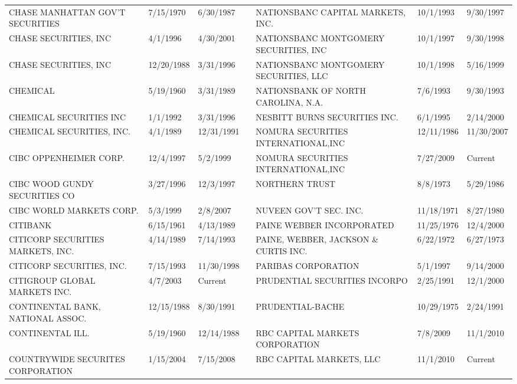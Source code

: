 \begin{tabular}{lllllll}
CHASE MANHATTAN GOV'T SECURITIES     & 7/15/1970 & 6/30/1987 &  & NATIONSBANC CAPITAL MARKETS, INC.   & 10/1/1993 & 9/30/1997 \\
CHASE SECURITIES, INC               & 4/1/1996 & 4/30/2001 &  & NATIONSBANC MONTGOMERY SECURITIES, INC & 10/1/1997 & 9/30/1998 \\
CHASE SECURITIES, INC                & 12/20/1988 & 3/31/1996 &  & NATIONSBANC MONTGOMERY SECURITIES, LLC & 10/1/1998 & 5/16/1999 \\
CHEMICAL                            & 5/19/1960 & 3/31/1989 &  & NATIONSBANK OF NORTH CAROLINA, N.A. & 7/6/1993 & 9/30/1993 \\
CHEMICAL SECURITIES INC             & 1/1/1992 & 3/31/1996 &  & NESBITT BURNS SECURITIES INC.       & 6/1/1995 & 2/14/2000 \\
CHEMICAL SECURITIES, INC.           & 4/1/1989 & 12/31/1991 &  & NOMURA SECURITIES INTERNATIONAL,INC & 12/11/1986 & 11/30/2007 \\
CIBC OPPENHEIMER CORP.              & 12/4/1997 & 5/2/1999 &  & NOMURA SECURITIES INTERNATIONAL,INC & 7/27/2009 & Current \\
CIBC WOOD GUNDY SECURITIES CO       & 3/27/1996 & 12/3/1997 &  & NORTHERN TRUST                       & 8/8/1973 & 5/29/1986 \\
CIBC WORLD MARKETS CORP.            & 5/3/1999 & 2/8/2007 &  & NUVEEN GOV'T SEC. INC.               & 11/18/1971 & 8/27/1980 \\
CITIBANK                             & 6/15/1961 & 4/13/1989 &  & PAINE WEBBER INCORPORATED            & 11/25/1976 & 12/4/2000 \\
CITICORP SECURITIES MARKETS, INC.    & 4/14/1989 & 7/14/1993 &  & PAINE, WEBBER, JACKSON \& CURTIS INC. & 6/22/1972 & 6/27/1973 \\
CITICORP SECURITIES, INC.            & 7/15/1993 & 11/30/1998 &  & PARIBAS CORPORATION                  & 5/1/1997 & 9/14/2000 \\
CITIGROUP GLOBAL MARKETS INC.   & 4/7/2003 & Current &  & PRUDENTIAL SECURITIES INCORPO   & 2/25/1991 & 12/1/2000 \\
CONTINENTAL BANK, NATIONAL ASSOC.    & 12/15/1988 & 8/30/1991 &  & PRUDENTIAL-BACHE                & 10/29/1975 & 2/24/1991 \\
CONTINENTAL ILL.                     & 5/19/1960 & 12/14/1988 &  & RBC CAPITAL MARKETS CORPORATION & 7/8/2009 & 11/1/2010 \\
COUNTRYWIDE SECURITES CORPORATION & 1/15/2004 & 7/15/2008 &  & RBC CAPITAL MARKETS, LLC & 11/1/2010 & Current \\

\end{tabular}
